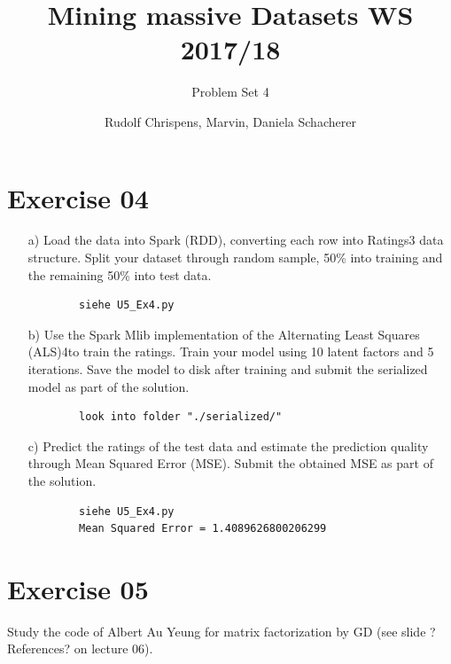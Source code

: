 \documentclass[11pt,a4paper]{scrartcl}
\title{Mining massive Datasets WS 2017/18}
\subtitle{Problem Set 4}
\author{Rudolf Chrispens, Marvin, Daniela Schacherer}
\begin{document}
\maketitle

\section*{Exercise 04}
	\begin{itemize}
	\item [a)] Load the data into Spark (RDD), converting each row into Ratings3 data structure. Split your dataset through random sample, 50\% into training and the remaining 50\% into test data.
	\begin{verbatim}
		siehe U5_Ex4.py
	\end{verbatim}	
	\item [b)] Use the Spark Mlib implementation of the Alternating Least Squares (ALS)4to train the ratings. Train your model using 10 latent factors and 5 iterations. Save the model to disk after training and submit the serialized model as part of the solution.
	\begin{verbatim}
		look into folder "./serialized/"
	\end{verbatim}	
	\item [c)] Predict the ratings of the test data and estimate the prediction quality through Mean Squared Error (MSE). Submit the obtained MSE as part of the solution.
	\begin{verbatim}
		siehe U5_Ex4.py
		Mean Squared Error = 1.4089626800206299
	\end{verbatim}	
\end{itemize}

\section*{Exercise 05}
Study the code of Albert Au Yeung for matrix factorization by GD (see slide ?References? on lecture 06).
\end{document}
